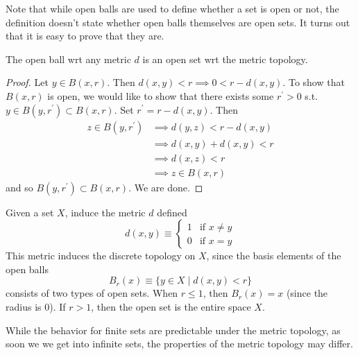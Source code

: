   Note that while open balls are used to define whether a set is open or not, the definition doesn't state whether open balls themselves are open sets. It turns out that it is easy to prove that they are. 
  
  \begin{lemma}
    The open ball wrt any metric $d$ is an open set wrt the metric topology. 
  \end{lemma}
  \begin{proof}
    Let $y \in B(x, r)$. Then $d(x, y) < r \implies 0 < r - d(x, y)$. To show that $B(x, r)$ is open, we would like to show that there exists some $r^\prime > 0$ s.t. $y \in B(y, r^\prime) \subset B(x, r)$. Set $r^\prime = r - d(x, y)$. Then 
    \begin{align}
      z \in B(y, r^\prime) & \implies d(y, z) < r - d(x, y) \\
                           & \implies d(x, y) + d(x, y) < r \\
                           & \implies d(x, z) < r \\
                           & \implies z \in B(x, r)
    \end{align} 
    and so $B(y, r^\prime) \subset B(x, r)$. We are done. 
  \end{proof}

  \begin{example}
    Given a set $X$, induce the metric $d$ defined
    \begin{equation}
      d(x, y) \equiv \begin{cases} 1 & \text{if } x \neq y \\ 0 & \text{if } x = y \end{cases}
    \end{equation}
    This metric induces the discrete topology on $X$, since the basis elements of the open balls
    \begin{equation}
      B_r (x) \equiv \{ y \in X \mid d(x, y) <r\}
    \end{equation}
    consists of two types of open sets. When $r \leq 1$, then $B_r (x) = x$ (since the radius is $0$). If $r > 1$, then the open set is the entire space $X$. 
  \end{example} 

  While the behavior for finite sets are predictable under the metric topology, as soon we we get into infinite sets, the properties of the metric topology may differ. 

